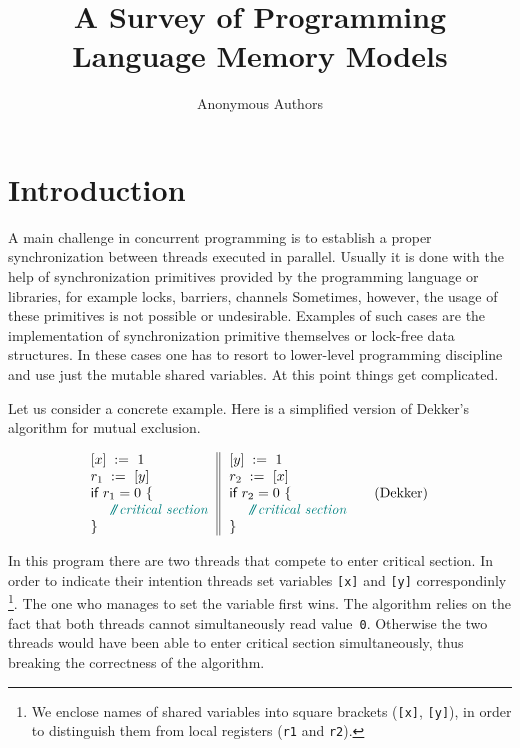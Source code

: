 \documentclass[a4paper,twoside,11pt]{article}
\author{Anonymous Authors}
\title{A Survey of Programming Language Memory Models}
\date{}
\numberwithin{equation}{section}
\begin{document}
\maketitle

\begin{abstract}
\end{abstract}

\section{Introduction}

A main challenge in concurrent programming is 
to establish a proper synchronization between threads executed in parallel.     
Usually it is done with the help of synchronization primitives
provided by the programming language or libraries,
for example locks, barriers, channels \etc
Sometimes, however, the usage of these primitives
is not possible or undesirable. 
Examples of such cases are the implementation 
of synchronization primitive themselves
or lock-free data structures.
In these cases one has to resort to 
lower-level programming discipline and 
use just the mutable shared variables. 
At this point things get complicated.


Let us consider a concrete example.
Here is a simplified version of Dekker's algorithm for mutual exclusion.

\begin{equation*}
\inarrII{
  \writeInst{}{x}{1} \\
  \readInst{}{r_1}{y}  \\
  \kw{if} {r_1 = 0} ~\{ \\
  ~~ \comment{critical section} \\
  \}
}{
  \writeInst{}{y}{1} \\
  \readInst{}{r_2}{x}  \\
  \kw{if} {r_2 = 0} ~\{ \\
  ~~ \comment{critical section} \\
  \}
}
\tag{Dekker}\label{ex:Dekker}
\end{equation*}

In this program there are two threads that compete to enter critical section.
In order to indicate their intention threads set 
variables \texttt{[x]} and \texttt{[y]} correspondinly
\footnote{We enclose names of shared variables into square brackets
(\ie \texttt{[x]}, \texttt{[y]}), in order to distinguish them 
from local registers (\ie \texttt{r1} and \texttt{r2}).}.
The one who manages to set the variable first wins.
The algorithm relies on the fact that both threads 
cannot simultaneously read value~\texttt{0}.
Otherwise the two threads would have been able 
to enter critical section simultaneously, 
thus breaking the correctness of the algorithm.
\end{document}
